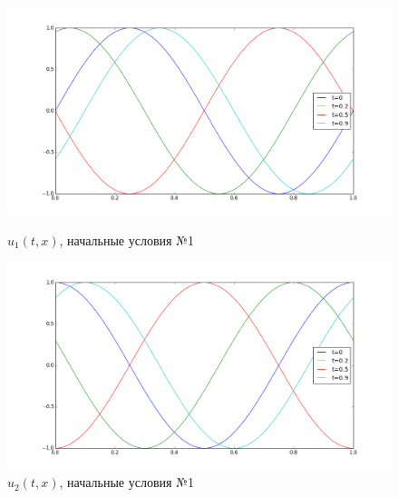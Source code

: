\documentclass[titlepage]{article}
\begin{document}
\begin{figure}[h]
\centering
\begin{minipage}{.5\textwidth}
  \centering
  \includegraphics[width = \textwidth]{1_1.png}
  \caption{$u_1(t,x)$, начальные условия №1}
  \label{fig:test1}
\end{minipage}%
\begin{minipage}{.5\textwidth}
  \centering
  \includegraphics[width = \textwidth]{1_2.png}
  \caption{$u_2(t,x)$, начальные условия №1}
\end{minipage}


\end{figure}
\end{document}
